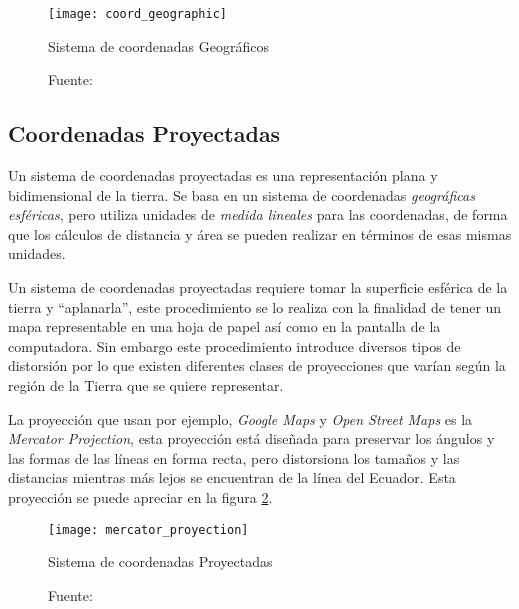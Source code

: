         \begin{figure}[!ht]
          \begin{center}
            \texttt{[image: coord\_geographic]}
            \caption{Sistema de coordenadas Geográficos}
            \label{fig:coord_geographic}
            \caption*{Fuente: \cite{coords2009} }
          \end{center}
        \end{figure}





      \subsection{Coordenadas Proyectadas} %
      \label{sub:coordenadas_proyectadas}
        Un sistema de coordenadas proyectadas es una representación plana y bidimensional de la  tierra. Se basa en un sistema de coordenadas \emph{geográficas esféricas}, pero utiliza unidades de \emph{medida lineales} para las coordenadas, de forma que los cálculos de distancia y área se pueden realizar en términos de esas mismas unidades. \cite{projected}

        Un sistema de coordenadas proyectadas requiere tomar la superficie esférica de la tierra y ``aplanarla'', este procedimiento se lo realiza con la finalidad de tener un mapa representable en una hoja de papel así como en la pantalla de la computadora. Sin embargo este procedimiento introduce diversos tipos de distorsión por lo que existen diferentes clases de proyecciones que varían según la región de la Tierra que se quiere representar.

        La proyección que usan por ejemplo, \emph{Google Maps} y \emph{Open Street Maps} es la \emph{Mercator Projection}, esta proyección está diseñada para preservar los ángulos y las formas de las líneas en forma recta, pero distorsiona los tamaños y las distancias mientras más lejos se encuentran de la línea del Ecuador. Esta proyección se puede apreciar en la figura \ref{fig:mercator_proyection}. \cite{gmaps_osm}


        \begin{figure}[!ht]
          \begin{center}
            \texttt{[image: mercator\_proyection]}
          \end{center}
          \caption{Sistema de coordenadas Proyectadas}
          \label{fig:mercator_proyection}
          \caption*{Fuente: \cite{coords2009} }
        \end{figure}

